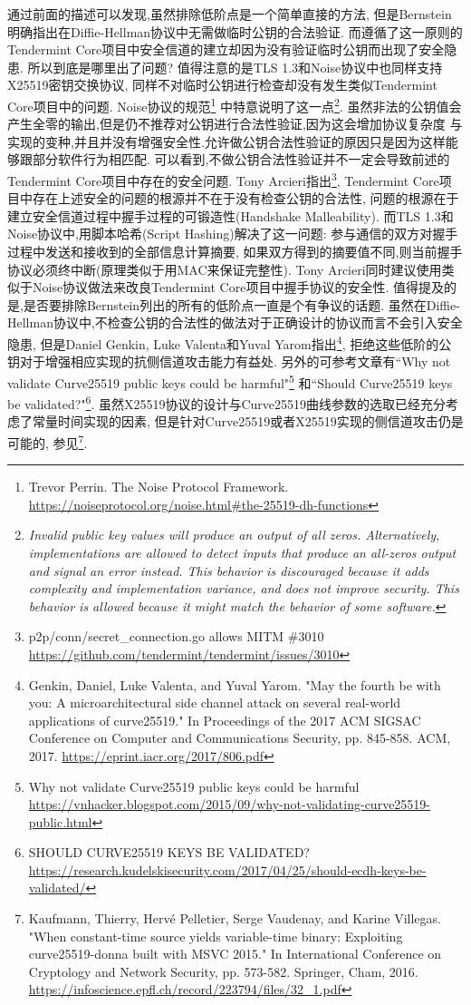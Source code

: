 通过前面的描述可以发现,虽然排除低阶点是一个简单直接的方法,
但是Bernstein明确指出在Diffie-Hellman协议中无需做临时公钥的合法验证.
而遵循了这一原则的Tendermint Core项目中安全信道的建立却因为没有验证临时公钥而出现了安全隐患.
所以到底是哪里出了问题? 值得注意的是TLS 1.3和Noise协议中也同样支持X25519密钥交换协议,
同样不对临时公钥进行检查却没有发生类似Tendermint Core项目中的问题.
Noise协议的规范\footnote{
Trevor Perrin. The Noise Protocol Framework.
\url{https://noiseprotocol.org/noise.html\#the-25519-dh-functions}}
中特意说明了这一点\footnote{\textit{Invalid public key values will produce an output of all zeros.
Alternatively, implementations are allowed to detect inputs that produce an all-zeros output and signal an error instead. This behavior is discouraged because it adds complexity and implementation variance, and does not improve security. This behavior is allowed because it might match the behavior of some software.}}.
虽然非法的公钥值会产生全零的输出,但是仍不推荐对公钥进行合法性验证,因为这会增加协议复杂度
与实现的变种,并且并没有增强安全性.允许做公钥合法性验证的原因只是因为这样能够跟部分软件行为相匹配.
可以看到,不做公钥合法性验证并不一定会导致前述的Tendermint Core项目中存在的安全问题.
Tony Arcieri指出\footnote{
p2p/conn/secret_connection.go allows MITM \#3010
\url{https://github.com/tendermint/tendermint/issues/3010}}, 
Tendermint Core项目中存在上述安全的问题的根源并不在于没有检查公钥的合法性,
问题的根源在于建立安全信道过程中握手过程的可锻造性(Handshake Malleability).
而TLS 1.3和Noise协议中,用脚本哈希(Script Hashing)解决了这一问题:
参与通信的双方对握手过程中发送和接收到的全部信息计算摘要,
如果双方得到的摘要值不同,则当前握手协议必须终中断(原理类似于用MAC来保证完整性).
Tony Arcieri同时建议使用类似于Noise协议做法来改良Tendermint Core项目中握手协议的安全性.
值得提及的是,是否要排除Bernstein列出的所有的低阶点一直是个有争议的话题.
虽然在Diffie-Hellman协议中,不检查公钥的合法性的做法对于正确设计的协议而言不会引入安全隐患,
但是Daniel Genkin, Luke Valenta和Yuval Yarom指出\footnote{
Genkin, Daniel, Luke Valenta, and Yuval Yarom. "May the fourth be with you: A microarchitectural side channel attack on several real-world applications of curve25519." In Proceedings of the 2017 ACM SIGSAC Conference on Computer and Communications Security, pp. 845-858. ACM, 2017.
\url{https://eprint.iacr.org/2017/806.pdf}}, 
拒绝这些低阶的公钥对于增强相应实现的抗侧信道攻击能力有益处.
另外的可参考文章有``Why not validate Curve25519 public keys could be harmful"\footnote{
Why not validate Curve25519 public keys could be harmful 
\url{https://vnhacker.blogspot.com/2015/09/why-not-validating-curve25519-public.html}}
和``Should Curve25519 keys be validated?"\footnote{
SHOULD CURVE25519 KEYS BE VALIDATED?
\url{https://research.kudelskisecurity.com/2017/04/25/should-ecdh-keys-be-validated/}}.
虽然X25519协议的设计与Curve25519曲线参数的选取已经充分考虑了常量时间实现的因素,
但是针对Curve25519或者X25519实现的侧信道攻击仍是可能的, 参见\footnote{
Kaufmann, Thierry, Hervé Pelletier, Serge Vaudenay, and Karine Villegas. "When constant-time source yields variable-time binary: Exploiting curve25519-donna built with MSVC 2015." In International Conference on Cryptology and Network Security, pp. 573-582. Springer, Cham, 2016.
\url{https://infoscience.epfl.ch/record/223794/files/32_1.pdf}}.